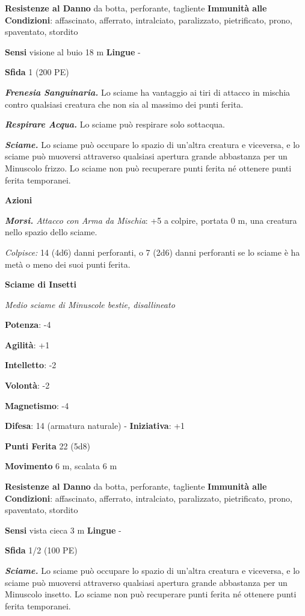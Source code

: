 \begin{multicols}{2}
\textbf{Resistenze al Danno} da botta, perforante, tagliente
\textbf{Immunità alle Condizioni}: affascinato, afferrato, intralciato,
paralizzato, pietrificato, prono, spaventato, stordito

\textbf{Sensi} visione al buio 18 m
\textbf{Lingue} -

\textbf{Sfida} 1 (200 PE)\smallskip

\emph{\textbf{Frenesia Sanguinaria.}} Lo sciame ha vantaggio ai tiri di
attacco in mischia contro qualsiasi creatura che non sia al massimo dei
punti ferita.

\emph{\textbf{Respirare Acqua.}} Lo sciame può respirare solo sottacqua.

\emph{\textbf{Sciame.}} Lo sciame può occupare lo spazio di un'altra
creatura e viceversa, e lo sciame può muoversi attraverso qualsiasi
apertura grande abbastanza per un Minuscolo frizzo. Lo sciame non può
recuperare punti ferita né ottenere punti ferita temporanei.

\smallskip\textbf{Azioni}

\emph{\textbf{Morsi.} Attacco con Arma da Mischia}: +5 a colpire,
portata 0 m, una creatura nello spazio dello sciame.

\emph{Colpisce:} 14 (4d6) danni perforanti, o 7 (2d6) danni perforanti
se lo sciame è ha metà o meno dei suoi punti ferita.

\textbf{Sciame di Insetti}

\emph{Medio sciame di Minuscole bestie, disallineato}

\textbf{Potenza}: -4

\textbf{Agilità}: +1

\textbf{Intelletto}: -2

\textbf{Volontà}: -2

\textbf{Magnetismo}: -4

\textbf{Difesa}: 14 (armatura naturale) - \textbf{Iniziativa}: +1

\textbf{Punti Ferita} 22 (5d8)

\textbf{Movimento} 6 m, scalata 6 m

\textbf{Resistenze al Danno} da botta, perforante, tagliente
\textbf{Immunità alle Condizioni}: affascinato, afferrato, intralciato,
paralizzato, pietrificato, prono, spaventato, stordito

\textbf{Sensi} vista cieca 3 m \textbf{Lingue} -

\textbf{Sfida} 1/2 (100 PE)\smallskip

\emph{\textbf{Sciame.}} Lo sciame può occupare lo spazio di un'altra
creatura e viceversa, e lo sciame può muoversi attraverso qualsiasi
apertura grande abbastanza per un Minuscolo insetto. Lo sciame non può
recuperare punti ferita né ottenere punti ferita temporanei.


\end{multicols}
